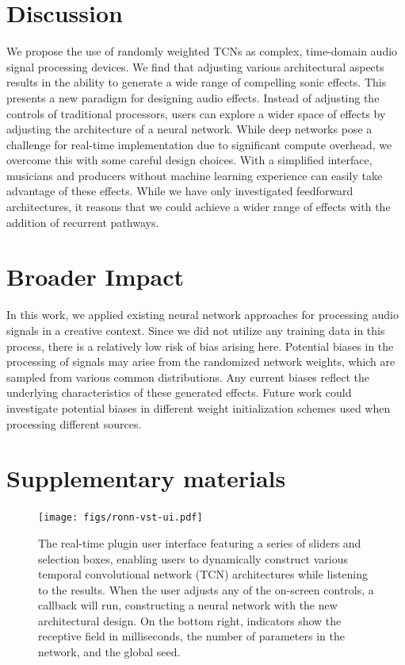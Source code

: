 \documentclass{article}
\begin{document}
\section{Discussion}

We propose the use of randomly weighted TCNs as complex, time-domain audio signal processing devices. 
We find that adjusting various architectural aspects results in the ability to generate a wide range of compelling sonic effects.
This presents a new paradigm for designing audio effects. 
Instead of adjusting the controls of traditional processors, users can explore a wider space of effects by adjusting the architecture of a neural network.
While deep networks pose a challenge for real-time implementation due to significant compute overhead, 
we overcome this with some careful design choices. 
With a simplified interface, musicians and producers without machine learning experience can easily take advantage of these effects.
While we have only investigated feedforward architectures, 
it reasons that we could achieve a wider range of effects with the addition of recurrent pathways.

\section*{Broader Impact}
In this work, we applied existing neural network approaches for processing audio signals in a creative context.
Since we did not utilize any training data in this process, there is a relatively low risk of bias arising here. 
Potential biases in the processing of signals may arise from the randomized network weights,
which are sampled from various common distributions. 
Any current biases reflect the underlying characteristics of these generated effects. 
Future work could investigate potential biases in different weight initialization schemes used when processing different sources. 

  

  
\newpage 
\section*{Supplementary materials}

\begin{figure}[h]
  \centering 
  \texttt{[image: figs/ronn-vst-ui.pdf]}  
  \caption{The real-time plugin user interface featuring a series of sliders and selection boxes, 
  enabling users to dynamically construct various temporal convolutional network (TCN) architectures while listening to the results.
  When the user adjusts any of the on-screen controls, a callback will run, 
  constructing a neural network with the new architectural design. 
  On the bottom right, indicators show the receptive field in milliseconds, 
  the number of parameters in the network, and the global seed.}
  \label{fig:ui}
\end{figure}
\end{document}
